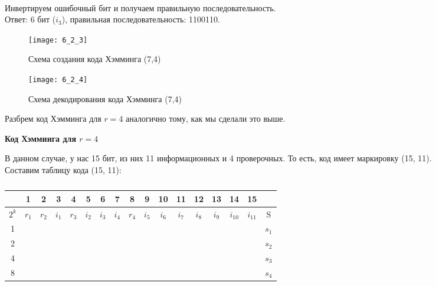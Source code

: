\\Инвертируем ошибочный бит и получаем правильную последовательность.
\\Ответ: 6 бит ($i_3$), правильная последовательность: 1100110.
\begin{figure}[h]
\texttt{[image: 6\_2\_3]}
\caption{Схема создания кода Хэмминга (7,4)}
\end{figure}
\begin{figure}
\texttt{[image: 6\_2\_4]}
\caption{Схема декодирования кода Хэмминга (7,4)}
\end{figure}
\newpage
Разбрем код Хэмминга для $r = 4$ аналогично тому, как мы сделали это выше.
\begin{center}
\textbf{Код Хэмминга для $r = 4$}
\end{center}
В данном случае, у нас 15 бит, из них 11 информационных и 4 проверочных. То есть, код имеет маркировку (15, 11).
\\Составим таблицу кода (15, 11):
\begin{table}[h]
\caption{}
\begin{tabular}{|c|c|c|c|c|c|c|c|c|c|c|c|c|c|c|c|c|}
\hline
& 1 & 2 & 3 & 4 & 5 & 6 & 7 & 8 & 9 & 10 & 11 & 12 & 13 & 14 & 15 & \\
\hline
$2^k$ & $r_{1}$ & $r_{2}$ & $i_{1}$ & $r_{3}$ & $i_{2}$ & $i_{3}$ & $i_{4}$ & $r_{4}$ & $i_{5}$ & $i_{6}$ & $i_{7}$ & $i_{8}$ & $i_{9}$ & $i_{10}$& $i_{11}$ &S\\
\hline
1 & \cellcolor{Gray1}{X} & & \cellcolor{Gray1}{X} & & \cellcolor{Gray1}{X} & & \cellcolor{Gray1}{X} & & \cellcolor{Gray1}{X} & & \cellcolor{Gray1}{X} & & \cellcolor{Gray1}{X} & & \cellcolor{Gray1}{X} & $s_{1}$\\
\hline
2 & & \cellcolor{Gray2}{X} & \cellcolor{Gray2}{X} & & & \cellcolor{Gray2}{X} & \cellcolor{Gray2}{X} & & & \cellcolor{Gray2}{X} & \cellcolor{Gray2}{X} & & & \cellcolor{Gray2}{X} & \cellcolor{Gray2}{X} & $s_{2}$ \\
\hline
4 & & & & \cellcolor{Gray3}{X} & \cellcolor{Gray3}{X} & \cellcolor{Gray3}{X} & \cellcolor{Gray3}{X} & & & & & \cellcolor{Gray3}{X} & \cellcolor{Gray3}{X} & \cellcolor{Gray3}{X} & \cellcolor{Gray3}{X} & $s_{3}$ \\
\hline
8 & & & & & & & & \cellcolor{Gray4}{X} & \cellcolor{Gray4}{X} & \cellcolor{Gray4}{X} & \cellcolor{Gray4}{X} & \cellcolor{Gray4}{X} & \cellcolor{Gray4}{X} & \cellcolor{Gray4}{X} & \cellcolor{Gray4}{X} & $s_{4}$\\
\hline
\end{tabular}
\end{table}
